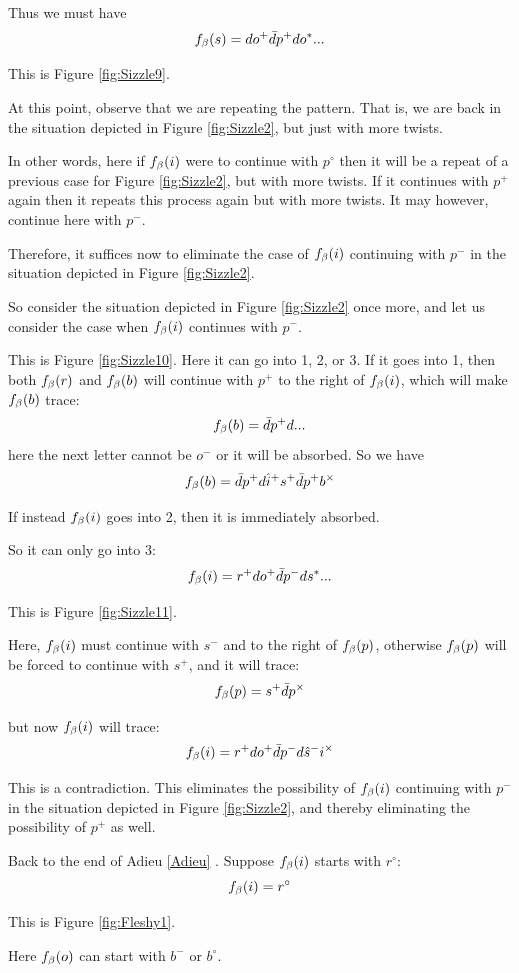 Thus we must have
\[
f_\beta(s) = d o^+ \bar{d} p^+ d o^*...
\]

This is Figure \ref{fig:Sizzle9}.

At this point, observe that we are repeating the pattern. That is, we are back in the situation depicted in Figure \ref{fig:Sizzle2}, but just with more twists.

In other words, here if $f_\beta(i)$ were to continue with $p^\circ$ then it will be a repeat of a previous case for Figure \ref{fig:Sizzle2}, but with more twists. If it continues with $p^+$ again then it repeats this process again but with more twists. It may however, continue here with $p^-$.

Therefore, it suffices now to eliminate the case of $f_\beta(i)$ continuing with $p^-$ in the situation depicted in Figure \ref{fig:Sizzle2}.

So consider the situation depicted in Figure \ref{fig:Sizzle2} once more, and let us consider the case when $f_\beta(i)$ continues with $p^-$.

This is Figure \ref{fig:Sizzle10}. Here it can go into 1, 2, or 3. If it goes into 1, then both $f_\beta(r)$ and $f_\beta(b)$ will continue with $p^+$ to the right of $f_\beta(i)$, which will make $f_\beta(b)$ trace:
\[
f_\beta(b) = \bar{d} p^+ d...
\]
here the next letter cannot be $o^-$ or it will be absorbed. So we have
\[
f_\beta(b) = \bar{d} p^+ d \hat{i}^+ s^+ \bar{d} p^+ b^\times
\]

If instead $f_\beta(i)$ goes into 2, then it is immediately absorbed.

So it can only go into 3:
\[
f_\beta(i) = r^+ d o^+ \bar{d} p^- d s^*...
\]

This is Figure \ref{fig:Sizzle11}.

Here, $f_\beta(i)$ must continue with $s^-$ and to the right of $f_\beta(p)$, otherwise $f_\beta(p)$ will be forced to continue with $s^+$, and it will trace:
\[
f_\beta(p) = s^+ \bar{d} p^\times
\]

but now $f_\beta(i)$ will trace:
\[
f_\beta(i) = r^+ d o^+ \bar{d} p^- d \hat{s}^- i^\times
\]

This is a contradiction. This eliminates the possibility of $f_\beta(i)$ continuing with $p^-$ in the situation depicted in Figure \ref{fig:Sizzle2}, and thereby eliminating the possibility of $p^+$ as well.

\label{Fleshy}
Back to the end of Adieu \ref{Adieu}
. Suppose $f_\beta(i)$ starts with $r^\circ$:
\[
f_\beta(i) = r^\circ
\]

This is Figure \ref{fig:Fleshy1}.

Here $f_\beta(o)$ can start with $b^-$ or $b^\circ$.

